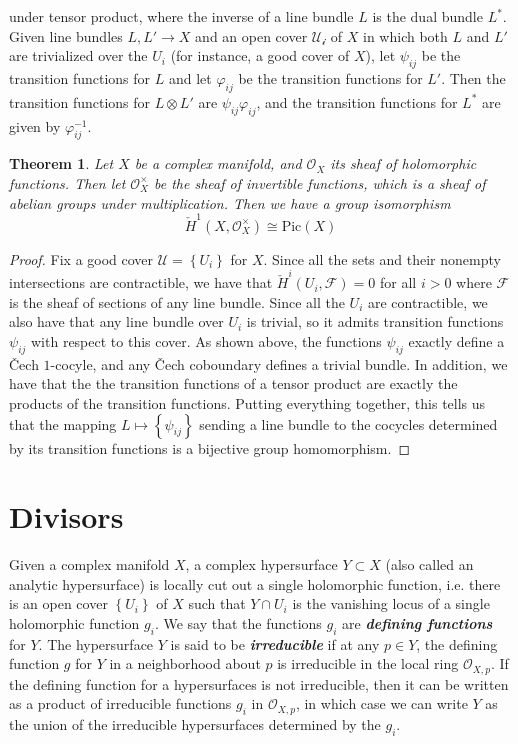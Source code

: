 \documentclass[psamsfonts, 12pt]{amsart}
\newtheorem{thm}{Theorem}[section]
\theoremstyle{definition}
\theoremstyle{remark}
\renewcommand{\O}{\mathcal{O}}
\newcommand{\ib}[1]{\textbf{\textit{#1}}}
\newcommand{\inv}{^{-1}}
\newcommand{\set}[1]{\left\lbrace #1 \right\rbrace}
\begin{document}
under tensor product, where the inverse of a line bundle $L$ is the dual bundle
$L^*$. Given line bundles $L,L' \to X$ and an open cover $\mathcal{U_i}$ of $X$
in which both $L$ and $L'$ are trivialized over the $U_i$ (for instance, a good cover
of $X$), let $\psi_{ij}$ be the transition functions for $L$ and let $\varphi_{ij}$
be the transition functions for $L'$. Then the transition functions for $L\otimes L'$
are $\psi_{ij}\varphi_{ij}$, and the transition functions for $L^*$ are given
by $\varphi_{ij}\inv$.
%
\begin{thm}
Let $X$ be a complex manifold, and $\O_X$ its sheaf of holomorphic functions.
Then let $\O_X^\times$ be the sheaf of invertible functions, which is a
sheaf of abelian groups under multiplication. Then we have a group isomorphism
\[
\check{H}^1(X,\O_X^\times) \cong \mathrm{Pic}(X)
\]
\end{thm}
%
\begin{proof}
Fix a good cover $\mathcal{U} = \set{U_i}$ for $X$. Since all the sets and their
nonempty intersections are contractible, we have that
$\check{H}^i(U_i, \mathcal{F}) = 0$ for all $i > 0$ where $\mathcal{F}$ is the sheaf
of sections of any line bundle. Since all the $U_i$ are contractible, we also
have that any line bundle over $U_i$ is trivial, so it admits transition
functions $\psi_{ij}$ with respect to this cover. As shown above, the
functions $\psi_{ij}$ exactly define a \v{C}ech $1$-cocyle, and any
\v{C}ech coboundary defines a trivial bundle. In addition, we have that
the the transition functions of a tensor product are exactly the products
of the transition functions. Putting everything together, this tells us that
the mapping $L \mapsto \set{\psi_{ij}}$ sending a line bundle to the cocycles
determined by its transition functions is a bijective group homomorphism.
\end{proof}
%
\section{Divisors}
%
Given a complex manifold $X$, a complex hypersurface $Y \subset X$ (also called an
analytic hypersurface) is locally cut out a single holomorphic function, i.e. there is
an open cover $\set{U_i}$ of $X$ such that $Y \cap U_i$ is the vanishing locus of a
single holomorphic function $g_i$. We say that the functions $g_i$ are
\ib{defining functions} for $Y$. The hypersurface $Y$ is said to be \ib{irreducible}
if at any $p \in Y$, the defining function $g$ for $Y$ in a neighborhood about
$p$ is irreducible in the local ring $\O_{X,p}$. If the defining function for a
hypersurfaces is not irreducible, then it can be written as a product of irreducible
functions $g_i$ in $\O_{X,p}$, in which case we can write $Y$ as the union of the
irreducible hypersurfaces determined by the $g_i$. \\
\end{document}
